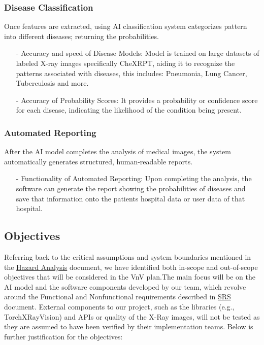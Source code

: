 \documentclass[12pt, titlepage]{article}
\begin{document}
\subsubsection{Disease Classification}
Once features are extracted, using AI classification system categorizes pattern  into different diseases; returning the probabilities.
    \begin{itemize}
        \item[-] Accuracy and speed of Disease Models: Model is trained on large datasets of labeled X-ray images specifically CheXRPT, aiding it to recognize the patterns associated with diseases, this includes: Pneumonia, Lung Cancer, Tuberculosis and more.
        \item[-] Accuracy  of Probability Scores: It provides a probability or confidence score for each disease, indicating the likelihood of the condition being present.
    \end{itemize}
\subsubsection{Automated Reporting}
After the AI model completes the analysis of medical images, the system automatically generates structured, human-readable reports.
    \begin{itemize}
            \item[-] Functionality of Automated Reporting: Upon completing the analysis, the software can generate the report showing the probabilities of diseases and save that information onto the patients hospital data or user data of that hospital.
    \end{itemize}
    \subsection{Objectives}

    Referring back to the critical assumptions and system boundaries mentioned in the \href{https://github.com/RezaJodeiri/CXR-Capstone/blob/main/docs/HazardAnalysis/HazardAnalysis.pdf}{Hazard Analysis} \citep{HA}
    document, we have identified both in-scope and out-of-scope objectives that will be considered in the VnV plan.The main focus will be on the AI model and the software components developed by our team, which revolve around the Functional and Nonfunctional requirements described in \href{https://github.com/RezaJodeiri/CXR-Capstone/blob/main/docs/SRS/SRS.pdf}{SRS} \citep{SRS}
    document. External components to our project, such as the libraries (e.g., TorchXRayVision) and APIs or quality of the X-Ray images, will not be tested as they are assumed to have been verified by their implementation teams. Below is further justification for the objectives:
    
\end{document}
